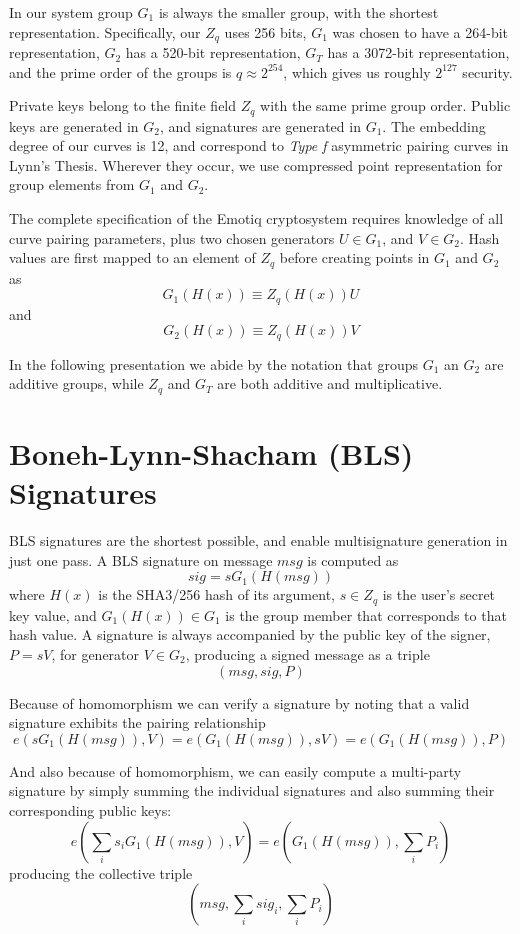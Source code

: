 \documentclass[article,oneside]{memoir}
\begin{document}
In our system group $G_1$ is always the smaller group, with the shortest representation. Specifically, our $Z_q$ uses 256 bits, $G_1$ was chosen to have a 264-bit representation, $G_2$ has a 520-bit representation, $G_T$ has a 3072-bit representation, and the prime order of the groups is $q \approx  2^{254}$, which gives us roughly $2^{127}$ security.

Private keys belong to the finite field $Z_q$ with the same prime group order. Public keys are generated in $G_2$, and signatures are generated in $G_1$. The embedding degree of our curves is 12, and correspond to {\emph{Type f}} asymmetric pairing curves in Lynn's Thesis\cite{thesis}. Wherever they occur, we use  compressed point representation for group elements from $G_1$ and $G_2$.

The complete specification of the Emotiq cryptosystem requires knowledge of all curve pairing parameters, plus two chosen generators $U \in G_1$, and $V \in G_2$. Hash values are first mapped to an element of $Z_q$ before creating points in $G_1$ and $G_2$ as $$G_1(H(x)) \equiv Z_q(H(x))U$$ and $$G_2(H(x)) \equiv Z_q(H(x)) V$$

In the following presentation we abide by the notation that groups $G_1$ an $G_2$ are additive groups, while $Z_q$ and $G_T$ are both additive and multiplicative.

\chapter{Boneh-Lynn-Shacham (BLS) Signatures}

BLS signatures are the shortest possible, and enable multisignature generation in just one pass. A BLS signature on message $msg$ is computed as $$sig = s G_1(H(msg))$$ where $H(x)$ is the SHA3/256 hash of its argument, $s \in Z_q$ is the user's secret key value, and $G_1(H(x)) \in G_1$ is the group member that corresponds to that hash value. A signature is always accompanied by the public key of the signer, $P = s V$, for generator $V \in G_2$,  producing a signed message as a triple $$(msg, sig, P)$$

Because of homomorphism we can verify a signature by noting that a valid signature exhibits the pairing relationship $$e(s  G_1(H(msg)),V) = e(G_1(H(msg)), s V) = e(G_1(H(msg)), P)$$

And also because of homomorphism, we can easily compute a multi-party signature by simply summing the individual signatures and also summing their corresponding public keys: $$e({\sum_i s_i} G_1(H(msg)),V) = e(G_1(H(msg)), {\sum_i P_i})$$ producing the collective triple $$(msg, {\sum_i sig_i}, {\sum_i P_i})$$
\end{document}
